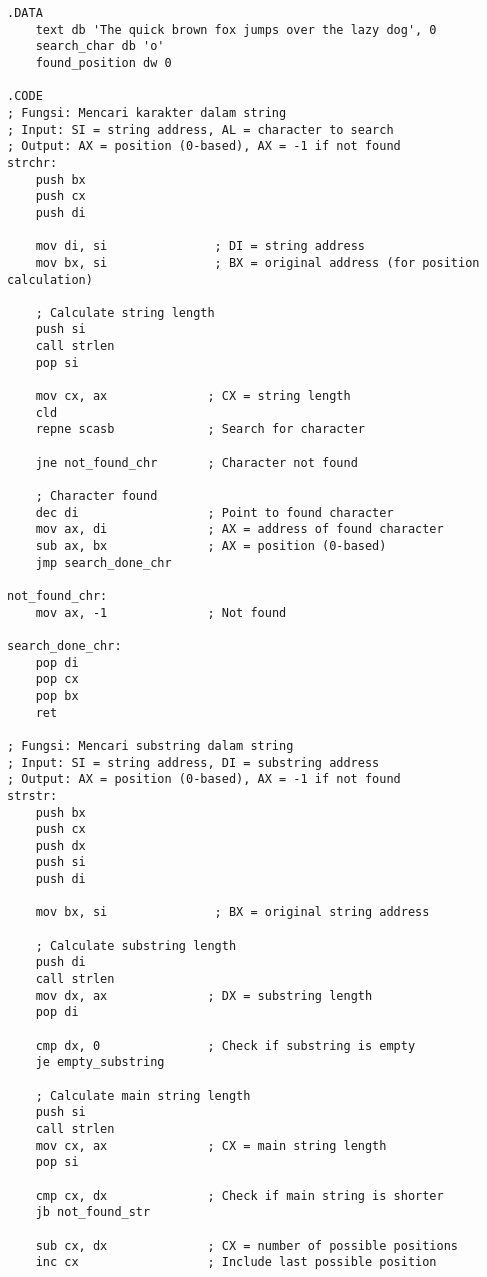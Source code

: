\documentclass[../main.tex]{subfiles}
\begin{document}
                \begin{lstlisting}[language={[x86masm]Assembler}, caption=Mencari Karakter dalam String, label={lst:string-search}]
.DATA
    text db 'The quick brown fox jumps over the lazy dog', 0
    search_char db 'o'
    found_position dw 0

.CODE
; Fungsi: Mencari karakter dalam string
; Input: SI = string address, AL = character to search
; Output: AX = position (0-based), AX = -1 if not found
strchr:
    push bx
    push cx
    push di
    
    mov di, si               ; DI = string address
    mov bx, si               ; BX = original address (for position calculation)
    
    ; Calculate string length
    push si
    call strlen
    pop si
    
    mov cx, ax              ; CX = string length
    cld
    repne scasb             ; Search for character
    
    jne not_found_chr       ; Character not found
    
    ; Character found
    dec di                  ; Point to found character
    mov ax, di              ; AX = address of found character
    sub ax, bx              ; AX = position (0-based)
    jmp search_done_chr
    
not_found_chr:
    mov ax, -1              ; Not found
    
search_done_chr:
    pop di
    pop cx
    pop bx
    ret

; Fungsi: Mencari substring dalam string
; Input: SI = string address, DI = substring address
; Output: AX = position (0-based), AX = -1 if not found
strstr:
    push bx
    push cx
    push dx
    push si
    push di
    
    mov bx, si               ; BX = original string address
    
    ; Calculate substring length
    push di
    call strlen
    mov dx, ax              ; DX = substring length
    pop di
    
    cmp dx, 0               ; Check if substring is empty
    je empty_substring
    
    ; Calculate main string length
    push si
    call strlen
    mov cx, ax              ; CX = main string length
    pop si
    
    cmp cx, dx              ; Check if main string is shorter
    jb not_found_str
    
    sub cx, dx              ; CX = number of possible positions
    inc cx                  ; Include last possible position
    

\end{lstlisting}
\end{document}
